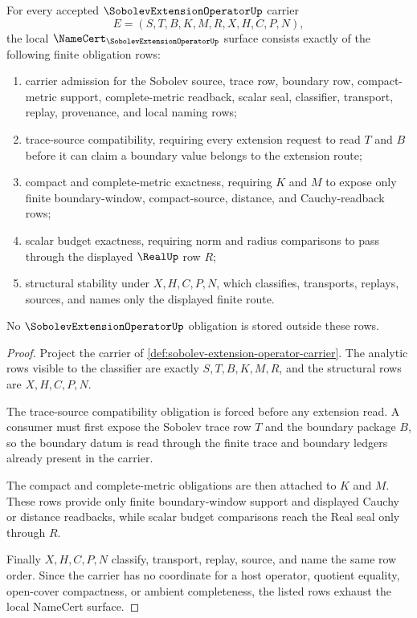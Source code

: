\begin{theorem}
\label{thm:sobolev-extension-operator-namecert-obligations}
For every accepted $\SobolevExtensionOperatorUp$ carrier
$$
E=(S,T,B,K,M,R,X,H,C,P,N),
$$
the local $\NameCert_{\SobolevExtensionOperatorUp}$ surface consists exactly of the following finite obligation rows:
\begin{enumerate}
\item carrier admission for the Sobolev source, trace row, boundary row, compact-metric support, complete-metric readback, scalar seal, classifier, transport, replay, provenance, and local naming rows;
\item trace-source compatibility, requiring every extension request to read $T$ and $B$ before it can claim a boundary value belongs to the extension route;
\item compact and complete-metric exactness, requiring $K$ and $M$ to expose only finite boundary-window, compact-source, distance, and Cauchy-readback rows;
\item scalar budget exactness, requiring norm and radius comparisons to pass through the displayed $\RealUp$ row $R$;
\item structural stability under $X,H,C,P,N$, which classifies, transports, replays, sources, and names only the displayed finite route.
\end{enumerate}
No $\SobolevExtensionOperatorUp$ obligation is stored outside these rows.
\end{theorem}
\begin{proof}
Project the carrier of \autoref{def:sobolev-extension-operator-carrier}. The analytic rows visible to the classifier are exactly $S,T,B,K,M,R$, and the structural rows are $X,H,C,P,N$.

The trace-source compatibility obligation is forced before any extension read. A consumer must first expose the Sobolev trace row $T$ and the boundary package $B$, so the boundary datum is read through the finite trace and boundary ledgers already present in the carrier.

The compact and complete-metric obligations are then attached to $K$ and $M$. These rows provide only finite boundary-window support and displayed Cauchy or distance readbacks, while scalar budget comparisons reach the Real seal only through $R$.

Finally $X,H,C,P,N$ classify, transport, replay, source, and name the same row order. Since the carrier has no coordinate for a host operator, quotient equality, open-cover compactness, or ambient completeness, the listed rows exhaust the local NameCert surface.
\end{proof}

